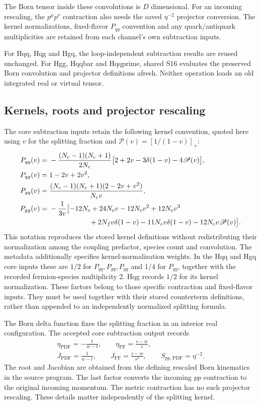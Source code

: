 \documentclass[11pt,a4paper]{article}
\newcommand{\PDF}{\mathrm{PDF}}
\newcommand{\FF}{\mathrm{FF}}
\begin{document}
The Born tensor inside these convolutions is $D$ dimensional. For an
incoming rescaling, the $p^\mu p^\nu$ contraction also needs the saved
$\eta^{-2}$ projector conversion. The kernel normalizations, fixed-flavor
$P_{qg}$ convention and any quark/antiquark multiplicities are retained
from each channel's own subtraction inputs.

For Hqq, Hqg and Hgq, the loop-independent subtraction results are reused
unchanged. For Hgg, Hqqbar and Hqqprime, shared S16 evaluates the preserved
Born convolution and projector definitions afresh. Neither operation
loads an old integrated real or virtual tensor.

\subsection{Kernels, roots and projector rescaling}

The core subtraction inputs retain the following kernel convention,
quoted here using $v$ for the splitting fraction and
$\mathscr P(v)=[1/(1-v)]_+$:
\begin{align}
 P_{qq}(v)={}&-\frac{(N_c-1)(N_c+1)}{2N_c}
 \bigl[2+2v-3\delta(1-v)-4\mathscr P(v)\bigr],\\
 P_{qg}(v)={}&1-2v+2v^2,\\
 P_{gq}(v)={}&\frac{(N_c-1)(N_c+1)(2-2v+v^2)}{N_c v},\\
 P_{gg}(v)={}&-\frac{1}{3v}\bigl[-12N_c+24N_cv-12N_cv^2+12N_cv^3
 \nonumber\\
 &\hspace{20mm}+2N_fv\delta(1-v)-11N_cv\delta(1-v)
                    -12N_cv\mathscr P(v)\bigr].
 \label{eq:storedkernels}
\end{align}
This notation reproduces the stored kernel definitions without
redistributing their normalization among the coupling prefactor,
species count and convolution. The metadata additionally specifies
kernel-normalization weights. In the Hqq and Hgq core inputs these are
$1/2$ for $P_{qq},P_{gq},P_{gg}$ and $1/4$ for $P_{qg}$, together with
the recorded fermion-species multiplicity 2. Hqg records $1/2$ for its
kernel normalization. These factors belong to those specific contraction
and fixed-flavor inputs. They must be used together with their stored
counterterm definitions, rather than appended to an independently
normalized splitting formula.

The Born delta function fixes the splitting fraction in an interior real
configuration. The accepted core subtraction output records
\begin{gather}
 \eta_{\PDF}=-\frac{t}{w-t},\qquad
 \eta_{\FF}=\frac{s-w}{s},\\
 J_{\PDF}=\frac{1}{w-t},\qquad
 J_{\FF}=\frac{s-w}{s^2},\qquad
 S_{pp,\PDF}=\eta^{-2}.
 \label{eq:ctroots}
\end{gather}
The root and Jacobian are obtained from the defining rescaled Born
kinematics in the source program. The last factor converts the incoming
$pp$ contraction to the original incoming momentum. The metric
contraction has no such projector rescaling. These details matter
independently of the splitting kernel.
\end{document}
